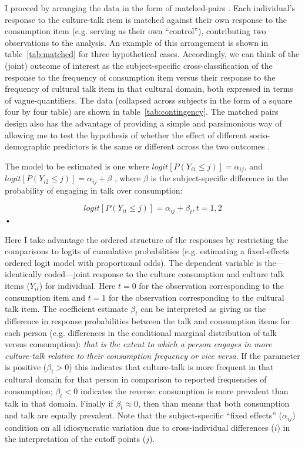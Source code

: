 I proceed by arranging the data in the form of matched-pairs \citep[247-256]{agresti07}.  Each individual's response to the culture-talk item is matched against their own response to the consumption item (e.g. serving as their own ``control''), contributing two observations to the analysis.  An example of this arrangement is shown in table~\ref{tab:matched} for three hypothetical cases.   Accordingly, we can think of the (joint) outcome of interest as the subject-specific cross-classification of the response to the frequency of consumption item versus their response to the frequency of cultural talk item in that cultural domain, both expressed in terms of vague-quantifiers.  The data (collapsed across subjects in the form of a square four by four table) are shown in table~\ref{tab:contingency}.  The matched pairs design also has the advantage of providing a simple and parsimonious way of allowing me to test the hypothesis of whether the effect of different socio-demographic predictors is the same or different across the two outcomes \citep[Pp.]{agresti07}.

The model to be estimated is one where $logit[P(Y_{i1}\leq j)]=\alpha_{ij}$, and $logit[P(Y_{i2}\leq j)]=\alpha_{ij} + \beta$ \citep[254]{agresti07}, where $\beta$ is the subject-specific difference in the probability of engaging in talk over consumption:

\begin{equation}
logit[P(Y_{it}\leq j)]=\alpha_{ij} + \beta_t, t=1,2
\label{eq1}
\end{equation}•

Here I take advantage the ordered structure of the responses by restricting the comparisons to logits of cumulative probabilities (e.g. estimating a fixed-effects ordered logit model with proportional odds).  The dependent variable is the---identically coded---joint response to the culture consumption and culture talk items ($Y_{it}$) for individual.  Here $t=0$ for the observation corresponding to the consumption item and $t=1$ for the observation corresponding to the cultural talk item.  The coefficient estimate $\beta_t$ can be interpreted as giving us the difference in response probabilities between the talk and consumption items for each person (e.g. differences in the conditional marginal distribution of talk versus consumption):  \emph{that is the extent to which a person engages in more culture-talk relative to their consumption frequency or vice versa}.   If the parameter is positive ($\beta_t>0$) this indicates that culture-talk is more frequent in that cultural domain for that person in comparison to reported frequencies of consumption;  $\beta_t<0$ indicates the reverse: consumption is more prevalent than talk in that domain.  Finally if $\beta_t \approx 0$, then than means that both consumption and talk are equally prevalent. Note that the subject-specific ``fixed effects'' ($\alpha_{ij}$) condition on all idiosyncratic variation due to cross-individual differences ($i$) in the interpretation of the cutoff points ($j$).

